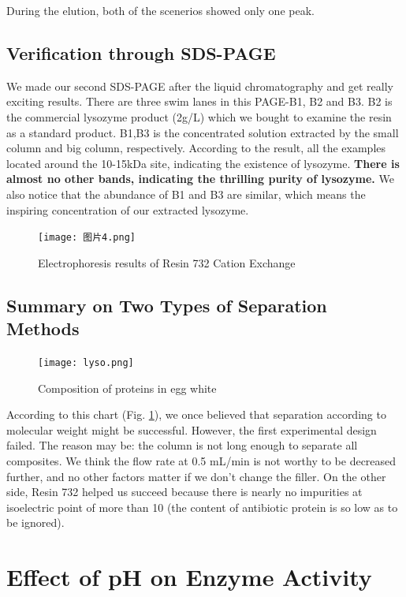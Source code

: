 During the elution, both of the scenerios showed only one peak.

\subsection{Verification through SDS-PAGE}

We made our second SDS-PAGE after the liquid chromatography and get really exciting results. There are three swim lanes in this PAGE-B1, B2 and B3. B2 is the commercial lysozyme product (2g/L) which we bought to examine the
resin as a standard product. B1,B3 is the concentrated solution extracted by the small column and big column, respectively. According to the result, all the examples located around
the 10-15kDa site, indicating the existence of lysozyme. \textbf{There is almost no other bands, indicating the thrilling purity of lysozyme.} We also notice
that the abundance of B1 and B3 are similar, which means the inspiring concentration of our extracted lysozyme.

\begin{figure}[!h]
	\centering
	\texttt{[image: 图片4.png]}
	\caption{Electrophoresis results of Resin 732 Cation Exchange}
\end{figure}

\subsection{Summary on Two Types of Separation Methods}
\begin{figure}[!h]
	\centering
	\texttt{[image: lyso.png]}
	\caption{Composition of proteins in egg white \citep{Zhang2003}}
	\label{tab:compo}
\end{figure}

According to this chart (Fig. \ref{tab:compo}), we once believed that separation according to molecular weight might be successful. However, the first experimental design failed. The reason may be: the column is not long enough to separate all composites. We think the flow rate at 0.5 mL/min is not worthy to be decreased further, and no other factors matter if we don't change the filler. On the other side, Resin 732 helped us succeed because there is nearly no impurities at isoelectric point of more than 10 (the content of antibiotic protein is so low as to be ignored).


\section{Effect of pH on Enzyme Activity}

